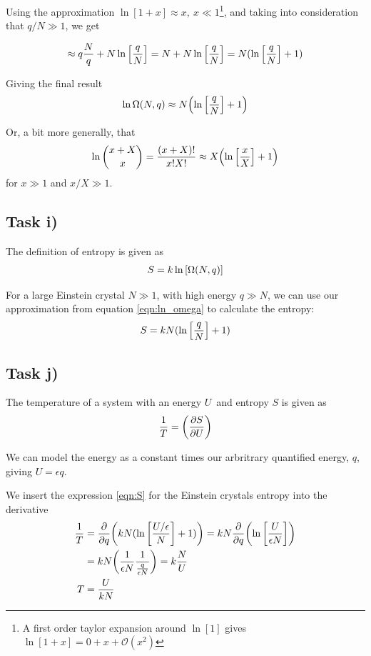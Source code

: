 \documentclass[12p,a4paper]{article}
\begin{document}
Using the approximation $\ln[1+x] \approx x,\ x\ll 1$\footnote{A first order taylor expansion around $\ln[1]$ gives $\ln[1+x] = 0 + x + \mathcal{O}(x^2)$}, and taking into consideration that $q/N \gg 1$, we get

\begin{align*}
    \approx q\frac{N}{q} + N\ln\qty[\frac{q}{N}] = N + N\ln\qty[\frac{q}{N}] = N(\ln\qty[\frac{q}{N}] + 1)
\end{align*}

Giving the final result
\begin{align}\label{eqn:ln_omega}
     \ln \Omega(N,q) \approx N\qty(\ln\qty[\frac{q}{N}] + 1)
\end{align}


Or, a bit more generally, that
\begin{align}\label{eqn:binom_approx}
    \ln\binom{x+X}{x} = \frac{(x+X)!}{x!X!} \approx X\qty(\ln\qty[\frac{x}{X}] + 1)
\end{align}
for $x \gg 1$ and $x/X \gg 1$.




\subsection*{Task i)}
The definition of entropy is given as
\begin{align*}
    S = k\ln\qty[\Omega(N,q)]
\end{align*}

For a large Einstein crystal $N \gg 1$, with high energy $q \gg N$, we can use our approximation from equation \ref{eqn:ln_omega} to calculate the entropy:
\begin{align}\label{eqn:S}
    S = kN(\ln\qty[\frac{q}{N}] + 1)
\end{align}




\subsection*{Task j)}
The temperature of a system with an energy $U$ and entropy $S$ is given as
\begin{align*}
    \frac{1}{T} = \qty(\frac{\partial S}{\partial U})
\end{align*}

We can model the energy as a constant times our arbritrary quantified energy, $q$, giving $U = \epsilon q$.

We insert the expression \ref{eqn:S} for the Einstein crystals entropy into the derivative
\begin{align*}
    \frac{1}{T} &= \frac{\partial}{\partial q}\qty( kN(\ln\qty[\frac{U/\epsilon}{N}] + 1) )
                 = kN\frac{\partial}{\partial q}\qty( \ln\qty[\frac{U}{\epsilon N}] ) \\
                &= kN \qty(\frac{1}{\epsilon N} \frac{1}{\frac{q}{\epsilon N}} )
                 = k\frac{N}{U} \\
                T &= \frac{U}{kN}
\end{align*}
\end{document}
